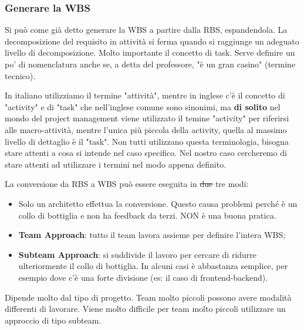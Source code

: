 \subsubsection{Generare la WBS}
Si può come già detto generare la WBS a partire dalla RBS, espandendola. La decomposizione del requisito in attività si ferma quando si raggiunge un adeguato livello di decomposizione.
Molto importante il concetto di task. Serve definire un po' di nomenclatura anche se, a detta del professore, "è un gran casino" (termine tecnico).
\begin{warn}[Terminologia]
	In italiano utilizziamo il termine "attività", mentre in inglese c'è il concetto di "activity" e di "task" che nell'inglese comune sono sinonimi, ma \textbf{di solito} nel mondo del project management viene utilizzato il temine "activity" per riferirsi alle macro-attività, mentre l'unica più piccola della activity, quella al massimo livello di dettaglio è il "task". Non tutti utilizzano questa terminologia, bisogna stare attenti a cosa si intende nel caso specifico. Nel nostro caso cercheremo di stare attenti ad utilizzare i termini nel modo appena definito.
\end{warn}
La conversione da RBS a WBS può essere eseguita in \st{due} tre modi:
\begin{itemize}
	\item Solo un architetto effettua la conversione. Questo causa problemi perché è un collo di bottiglia e non ha feedback da terzi. NON è una buona pratica.
	\item \textbf{Team Approach}: tutto il team lavora assieme per definire l'intera WBS;
	\item \textbf{Subteam Approach}: si suddivide il lavoro per cercare di ridurre ulteriormente il collo di bottiglia. In alcuni casi è abbastanza semplice, per esempio dove c'è una forte divisione (es: il caso di frontend-backend).
\end{itemize}
\begin{question}
	Dipende molto dal tipo di progetto. Team molto piccoli possono avere modalità differenti di lavorare. Viene molto difficile per team molto piccoli utilizzare un approccio di tipo subteam.
\end{question}

